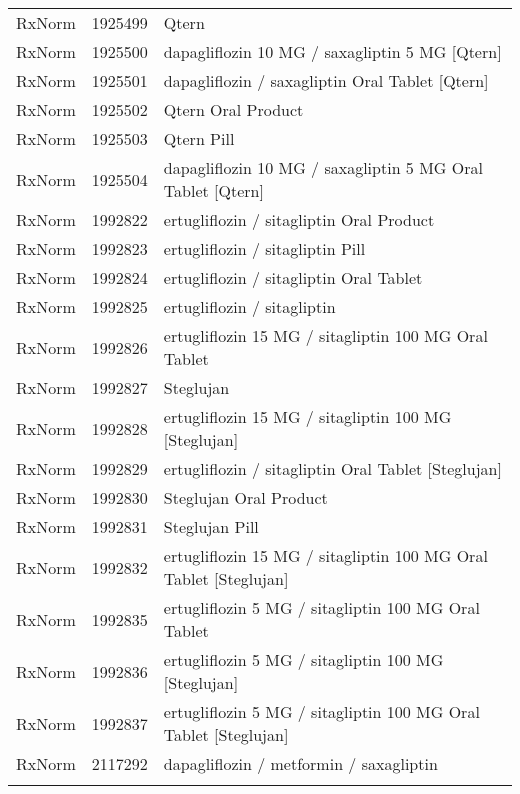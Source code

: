 \begin{longtable}{p{}p{}p{}}
  RxNorm & 1925499 & Qtern \\ 
  RxNorm & 1925500 & dapagliflozin 10 MG / saxagliptin 5 MG [Qtern] \\ 
  RxNorm & 1925501 & dapagliflozin / saxagliptin Oral Tablet [Qtern] \\ 
  RxNorm & 1925502 & Qtern Oral Product \\ 
  RxNorm & 1925503 & Qtern Pill \\ 
  RxNorm & 1925504 & dapagliflozin 10 MG / saxagliptin 5 MG Oral Tablet [Qtern] \\ 
  RxNorm & 1992822 & ertugliflozin / sitagliptin Oral Product \\ 
  RxNorm & 1992823 & ertugliflozin / sitagliptin Pill \\ 
  RxNorm & 1992824 & ertugliflozin / sitagliptin Oral Tablet \\ 
  RxNorm & 1992825 & ertugliflozin / sitagliptin \\ 
  RxNorm & 1992826 & ertugliflozin 15 MG / sitagliptin 100 MG Oral Tablet \\ 
  RxNorm & 1992827 & Steglujan \\ 
  RxNorm & 1992828 & ertugliflozin 15 MG / sitagliptin 100 MG [Steglujan] \\ 
  RxNorm & 1992829 & ertugliflozin / sitagliptin Oral Tablet [Steglujan] \\ 
  RxNorm & 1992830 & Steglujan Oral Product \\ 
  RxNorm & 1992831 & Steglujan Pill \\ 
  RxNorm & 1992832 & ertugliflozin 15 MG / sitagliptin 100 MG Oral Tablet [Steglujan] \\ 
  RxNorm & 1992835 & ertugliflozin 5 MG / sitagliptin 100 MG Oral Tablet \\ 
  RxNorm & 1992836 & ertugliflozin 5 MG / sitagliptin 100 MG [Steglujan] \\ 
  RxNorm & 1992837 & ertugliflozin 5 MG / sitagliptin 100 MG Oral Tablet [Steglujan] \\ 
  RxNorm & 2117292 & dapagliflozin / metformin / saxagliptin \\ 
  \hline
\label{tab:codes_dipeptidyl-peptidase-4-inhibitor-medications}
\end{longtable}
